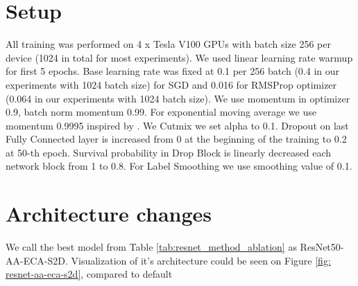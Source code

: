 \section{Setup}
All training was performed on 4 x Tesla V100 GPUs with batch size 256 per device (1024 in total for most experiments). We used linear learning rate warmup for first 5 epochs. Base learning rate was fixed at 0.1 per 256 batch (0.4 in our experiments with 1024 batch size) for SGD and 0.016 for RMSProp optimizer (0.064 in our experiments with 1024 batch size). We use momentum in optimizer 0.9, batch norm momentum 0.99. For exponential moving average we use momentum 0.9995 inspired by \cite{tan2021_efficientnetv2}. We Cutmix we set alpha to 0.1. Dropout on last Fully Connected layer is increased from 0 at the beginning of the training to 0.2 at 50-th epoch. Survival probability in Drop Block is linearly decreased each network block from 1 to 0.8. For Label Smoothing we use smoothing value of 0.1.  

\section{Architecture changes}
We call the best model from Table \ref{tab:resnet_method_ablation} as ResNet50-AA-ECA-S2D. Visualization of it's architecture could be seen on Figure \ref{fig: resnet-aa-eca-s2d}, compared to default 










